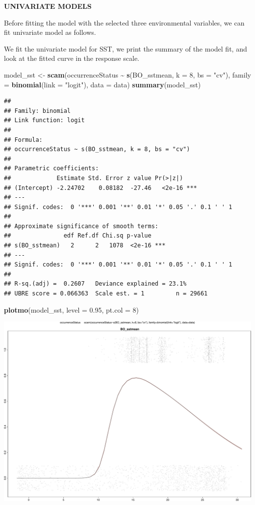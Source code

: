 \documentclass[
]{book}
\newenvironment{Shaded}{\begin{snugshade}}{\end{snugshade}}
\newcommand{\AttributeTok}[1]{\textcolor[rgb]{0.13,0.29,0.53}{#1}}
\newcommand{\DecValTok}[1]{\textcolor[rgb]{0.00,0.00,0.81}{#1}}
\newcommand{\FloatTok}[1]{\textcolor[rgb]{0.00,0.00,0.81}{#1}}
\newcommand{\FunctionTok}[1]{\textcolor[rgb]{0.13,0.29,0.53}{\textbf{#1}}}
\newcommand{\NormalTok}[1]{#1}
\newcommand{\OtherTok}[1]{\textcolor[rgb]{0.56,0.35,0.01}{#1}}
\newcommand{\SpecialCharTok}[1]{\textcolor[rgb]{0.81,0.36,0.00}{\textbf{#1}}}
\newcommand{\StringTok}[1]{\textcolor[rgb]{0.31,0.60,0.02}{#1}}
\begin{document}
\textbf{UNIVARIATE MODELS}

Before fitting the model with the selected three environmental variables, we can fit univariate model as follows.

We fit the univariate model for SST, we print the summary of the model fit, and look at the fitted curve in the response scale.

\begin{Shaded}
\begin{Highlighting}[]
\NormalTok{model\_sst }\OtherTok{\textless{}{-}} \FunctionTok{scam}\NormalTok{(occurrenceStatus }\SpecialCharTok{\textasciitilde{}} \FunctionTok{s}\NormalTok{(BO\_sstmean,}
    \AttributeTok{k =} \DecValTok{8}\NormalTok{, }\AttributeTok{bs =} \StringTok{"cv"}\NormalTok{), }\AttributeTok{family =} \FunctionTok{binomial}\NormalTok{(}\AttributeTok{link =} \StringTok{"logit"}\NormalTok{),}
    \AttributeTok{data =}\NormalTok{ data)}
\FunctionTok{summary}\NormalTok{(model\_sst)}
\end{Highlighting}
\end{Shaded}

\begin{verbatim}
## 
## Family: binomial 
## Link function: logit 
## 
## Formula:
## occurrenceStatus ~ s(BO_sstmean, k = 8, bs = "cv")
## 
## Parametric coefficients:
##             Estimate Std. Error z value Pr(>|z|)    
## (Intercept) -2.24702    0.08182  -27.46   <2e-16 ***
## ---
## Signif. codes:  0 '***' 0.001 '**' 0.01 '*' 0.05 '.' 0.1 ' ' 1
## 
## Approximate significance of smooth terms:
##               edf Ref.df Chi.sq p-value    
## s(BO_sstmean)   2      2   1078  <2e-16 ***
## ---
## Signif. codes:  0 '***' 0.001 '**' 0.01 '*' 0.05 '.' 0.1 ' ' 1
## 
## R-sq.(adj) =  0.2607   Deviance explained = 23.1%
## UBRE score = 0.066363  Scale est. = 1         n = 29661
\end{verbatim}

\begin{Shaded}
\begin{Highlighting}[]
\FunctionTok{plotmo}\NormalTok{(model\_sst, }\AttributeTok{level =} \FloatTok{0.95}\NormalTok{, }\AttributeTok{pt.col =} \DecValTok{8}\NormalTok{)}
\end{Highlighting}
\end{Shaded}

\includegraphics{_main_files/figure-latex/unnamed-chunk-61-1.pdf}
\end{document}

